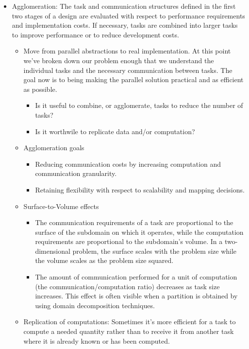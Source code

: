 \documentclass[paper=a4, fontsize=11pt]{scrartcl} %
\numberwithin{equation}{section} %
\numberwithin{figure}{section} %
\numberwithin{table}{section} %
\begin{document}
\begin{itemize}
\begin{itemize}
\begin{itemize}
\begin{itemize}
      \end{itemize}
    \end{itemize}
    \item Agglomeration: The task and communication structures defined in the first two stages of a design are evaluated with respect to performance requirements and implementation costs. If necessary, tasks are combined into larger tasks to improve performance or to reduce development costs.
    \begin{itemize}
      \item Move from parallel abstractions to real implementation. At this point we've broken down our problem enough that we understand the individual tasks and the necessary communication between tasks. The goal now is to being making the parallel solution practical and as efficient as possible.
      \begin{itemize}
        \item Is it useful to combine, or agglomerate, tasks to reduce the number of tasks?
        \item Is it worthwile to replicate data and/or computation?
      \end{itemize}
      \item Agglomeration goals
      \begin{itemize}
        \item Reducing communication costs by increasing computation and communication granularity.
        \item Retaining flexibility with respect to scalability and mapping decisions.
      \end{itemize}
      \item Surface-to-Volume effects
      \begin{itemize}
        \item The communication requirements of a task are proportional to the surface of the subdomain on which it operates, while the computation requirements are proportional to the subdomain's volume. In a two-dimensional problem, the surface scales with the problem size while the volume scales as the problem size squared.
        \item The amount of communication performed for a unit of computation (the communication/computation ratio) decreases as task size increases. This effect is often visible when a partition is obtained by using domain decomposition techniques.
      \end{itemize}
      \item Replication of computations: Sometimes it's more efficient for a task to compute a needed quantity rather than to receive it from another task where it is already known or has been computed.

\end{itemize}
\end{itemize}
\end{itemize}
\end{document}
